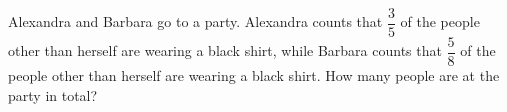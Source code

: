 Alexandra and Barbara go to a party. Alexandra counts that $\dfrac{3}{5}$ of the people other than herself are wearing a black shirt, while Barbara counts that  $\dfrac{5}{8}$ of the people other than herself are wearing a black shirt. How many people are at the party in total?
